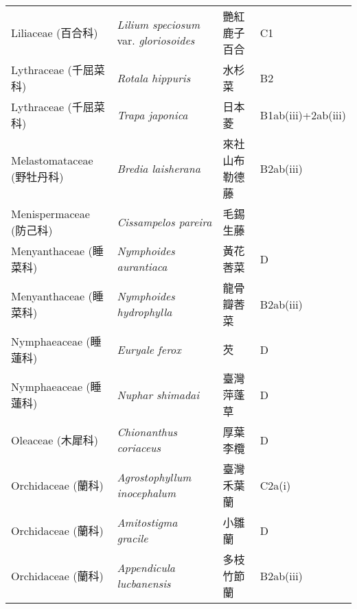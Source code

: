 \begin{longtable}{p{3cm}p{5cm}p{3cm}p{4cm}}
    Liliaceae (百合科) & \textit{Lilium speciosum} var. \textit{gloriosoides}  & 艷紅鹿子百合 & C1 \index{Lilium@\textit{Lilium}!speciosum@\textit{speciosum}!var. gloriosoides@var. \textit{gloriosoides}}  \index{艷紅鹿子百合} \\
    Lythraceae (千屈菜科) & \textit{Rotala hippuris}  & 水杉菜 & B2 \index{Rotala@\textit{Rotala}!hippuris@\textit{hippuris}}  \index{水杉菜} \\
    Lythraceae (千屈菜科) & \textit{Trapa japonica}  & 日本菱 & B1ab(iii)+2ab(iii) \index{Trapa@\textit{Trapa}!japonica@\textit{japonica}}  \index{日本菱} \\
    Melastomataceae (野牡丹科) & \textit{Bredia laisherana}  & 來社山布勒德藤 & B2ab(iii) \index{Bredia@\textit{Bredia}!laisherana@\textit{laisherana}}  \index{來社山布勒德藤} \\
    Menispermaceae (防己科) & \textit{Cissampelos pareira}  & 毛錫生藤 &  \index{Cissampelos@\textit{Cissampelos}!pareira@\textit{pareira}}  \index{毛錫生藤} \\
    Menyanthaceae (睡菜科) & \textit{Nymphoides aurantiaca}  & 黃花莕菜 & D \index{Nymphoides@\textit{Nymphoides}!aurantiaca@\textit{aurantiaca}}  \index{黃花莕菜} \\
    Menyanthaceae (睡菜科) & \textit{Nymphoides hydrophylla}  & 龍骨瓣莕菜 & B2ab(iii) \index{Nymphoides@\textit{Nymphoides}!hydrophylla@\textit{hydrophylla}}  \index{龍骨瓣莕菜} \\
    Nymphaeaceae (睡蓮科) & \textit{Euryale ferox}  & 芡 & D \index{Euryale@\textit{Euryale}!ferox@\textit{ferox}}  \index{芡} \\
    Nymphaeaceae (睡蓮科) & \textit{Nuphar shimadai}  & 臺灣萍蓬草 & D \index{Nuphar@\textit{Nuphar}!shimadai@\textit{shimadai}}  \index{臺灣萍蓬草} \\
    Oleaceae (木犀科) & \textit{Chionanthus coriaceus}  & 厚葉李欖 & D \index{Chionanthus@\textit{Chionanthus}!coriaceus@\textit{coriaceus}}  \index{厚葉李欖} \\
    Orchidaceae (蘭科) & \textit{Agrostophyllum inocephalum}  & 臺灣禾葉蘭 & C2a(i) \index{Agrostophyllum@\textit{Agrostophyllum}!inocephalum@\textit{inocephalum}}  \index{臺灣禾葉蘭} \\
    Orchidaceae (蘭科) & \textit{Amitostigma gracile}  & 小雛蘭 & D \index{Amitostigma@\textit{Amitostigma}!gracile@\textit{gracile}}  \index{小雛蘭} \\
    Orchidaceae (蘭科) & \textit{Appendicula lucbanensis}  & 多枝竹節蘭 & B2ab(iii) \index{Appendicula@\textit{Appendicula}!lucbanensis@\textit{lucbanensis}}  \index{多枝竹節蘭} \\

\end{longtable}

